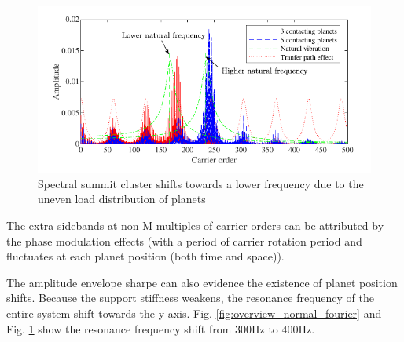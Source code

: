 \documentclass[a4paper,fleqn]{cas-sc}%
\begin{document}
\begin{figure}[pos=htbp]
    \centering
    \includegraphics[scale=1]{Shifted_natural_frequency}
    \caption{Spectral summit cluster shifts towards a lower frequency due to the uneven load distribution of planets}\label{fig:Shifted_natural_frequency}
\end{figure}
\par The extra sidebands at non M multiples of carrier orders can be attributed by the phase modulation effects (with a period of carrier rotation period and fluctuates at each planet position (both time and space)).
\par The amplitude envelope sharpe can also evidence the existence of planet position shifts. Because the support stiffness weakens, the resonance frequency of the entire system shift towards the y-axis. Fig. \ref{fig:overview_normal_fourier} and Fig. \ref{fig:Shifted_natural_frequency} show the resonance frequency shift from 300Hz to 400Hz.
\end{document}
